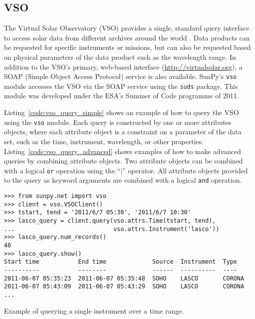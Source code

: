 \subsection{VSO}\label{ssec:vso}

The Virtual Solar Observatory (VSO) provides a single, standard query
interface to access solar data from different archives around the world
 \citep{hill2009}.
Data products can be requested for specific instruments or missions, but
can also be requested based on physical parameters of the data product such
as the wavelength range.
In addition to the VSO's primary, web-based interface
(\url{http://virtualsolar.org}), a SOAP (Simple Object Access Protocol)
service is also available.
SunPy's \texttt{vso} module accesses the VSO via the SOAP service using the
\texttt{suds} package.
This module was developed under the ESA's Summer of Code programme of 2011.

Listing~\ref{code:vso_query_simple} shows an example of how to query the VSO
using the \texttt{vso} module.
Each query is constructed by one or more attributes objects, where each
attribute object is a constraint on a parameter of the data set, such as the
time, instrument, wavelength, or  other properties.
Listing~\ref{code:vso_query_advanced} shows examples of how to make advanced
queries by combining attribute objects.
Two attribute objects can be combined with a logical \texttt{or} operation
using the ``$|$'' operator.
All attribute objects provided to the query as keyword arguments are combined
with a logical \texttt{and} operation.

\begin{listing}[h]
\begin{verbatim}
>>> from sunpy.net import vso
>>> client = vso.VSOClient()
>>> tstart, tend = '2011/6/7 05:30', '2011/6/7 10:30'
>>> lasco_query = client.query(vso.attrs.Time(tstart, tend),
...                            vso.attrs.Instrument('lasco'))
>>> lasco_query.num_records()
40
>>> lasco_query.show() 
Start time           End time             Source  Instrument  Type
----------           --------             ------  ----------  ----
2011-06-07 05:35:23  2011-06-07 05:35:48  SOHO    LASCO       CORONA
2011-06-07 05:43:09  2011-06-07 05:43:29  SOHO    LASCO       CORONA
...
\end{verbatim}
\caption{Example of querying a single instrument over a time range.}
\label{code:vso_query_simple}
\end{listing}

